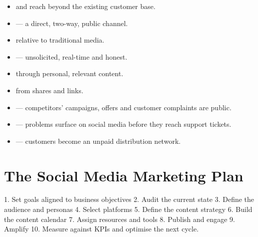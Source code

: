 \documentclass{MMTextbook}
\begin{document}
\begin{itemize}
\item {} and reach beyond the existing customer
      base.
\item {} --- a direct, two-way, public channel.
\item {} relative to traditional media.
\item {} --- unsolicited, real-time and
      honest.
\item {} through personal, relevant
      content.
\item {} from shares and links.
\item {} --- competitors' campaigns, offers and
      customer complaints are public.
\item {} --- problems surface on social media before they
      reach support tickets.
\item {} --- customers become an unpaid distribution
      network.
\end{itemize}

\section{The Social Media Marketing Plan}

\begin{frameworkbox}
1. Set goals aligned to business objectives \ra{} 2. Audit the current state
\ra{} 3. Define the audience and personas \ra{} 4. Select platforms \ra{}
5. Define the content strategy \ra{} 6. Build the content calendar \ra{}
7. Assign resources and tools \ra{} 8. Publish and engage \ra{} 9. Amplify
\ra{} 10. Measure against KPIs and optimise the next cycle.
\end{frameworkbox}
\end{document}
